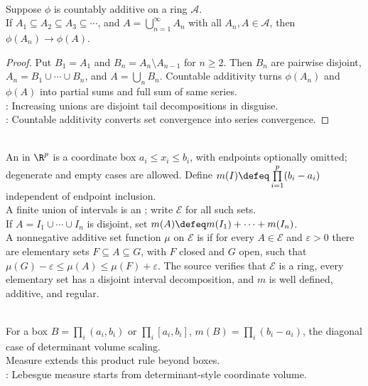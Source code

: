 \begin{theorem} \label{thm:continuity-from-below-set-functions} \\
Suppose $\phi$ is countably additive on a ring $\mathcal{A}$.\\
If $A_1\subseteq A_2\subseteq A_3\subseteq\cdots$, and $A=\bigcup\limits_{n=1}^{\infty}A_n$ with all $A_n,A\in\mathcal{A}$, then $\phi(A_n)\to\phi(A)$.
\begin{proof}
Put $B_1=A_1$ and $B_n=A_n\setminus A_{n-1}$ for $n\geq2$. Then $B_n$ are pairwise disjoint, $A_n=B_1\cup\cdots\cup B_n$, and $A=\bigcup_nB_n$. Countable additivity turns $\phi(A_n)$ and $\phi(A)$ into partial sums and full sum of same series.\\
: Increasing unions are disjoint tail decompositions in disguise.\\
: Countable additivity converts set convergence into series convergence.
\end{proof}
\end{theorem}

\begin{definition} \label{def:elementary-sets-and-regular-set-functions} \\
An  in $\R^p$ is a coordinate box $a_i\leq x_i\leq b_i$, with endpoints optionally omitted; degenerate and empty cases are allowed. Define $m(I)\defeq\prod\limits_{i=1}^{p}(b_i-a_i)$ independent of endpoint inclusion.\\
A finite union of intervals is an ; write $\mathcal{E}$ for all such sets.\\
If $A=I_1\cup\cdots\cup I_n$ is disjoint, set $m(A)\defeq m(I_1)+\cdots+m(I_n)$.\\
A nonnegative additive set function $\mu$ on $\mathcal{E}$ is  if for every $A\in\mathcal{E}$ and $\varepsilon>0$ there are elementary sets $F\subseteq A\subseteq G$, with $F$ closed and $G$ open, such that $\mu(G)-\varepsilon\leq\mu(A)\leq\mu(F)+\varepsilon$. The source verifies that $\mathcal{E}$ is a ring, every elementary set has a disjoint interval decomposition, and $m$ is well defined, additive, and regular.
\end{definition}

\begin{perspective} \label{per:box-volume-and-linear-algebra} \\
For a box $B=\prod_i(a_i,b_i)$ or $\prod_i[a_i,b_i]$, $m(B)=\prod_i(b_i-a_i)$, the diagonal case of determinant volume scaling.\\
Measure extends this product rule beyond boxes.\\
: Lebesgue measure starts from determinant-style coordinate volume.
\end{perspective}

